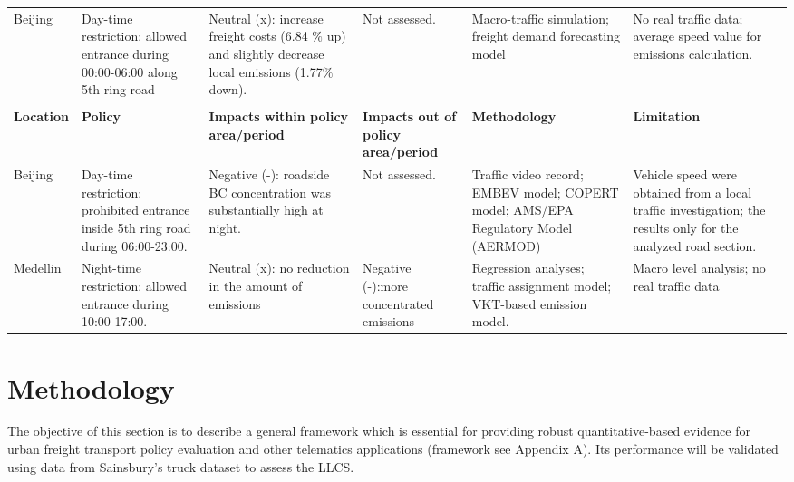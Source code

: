 \documentclass[preprint,12pt,3p]{elsarticle}
\begin{document}
\begin{landscape}
\begin{longtable}{m{2cm}<{\centering} m{3cm} m{4cm} m{4cm} m{3cm} m{6cm}}
   Beijing \cite{RN153} & Day-time restriction: allowed entrance  during 00:00-06:00 along 5th ring road & Neutral (x): increase freight costs  (6.84 $\%$ up) and slightly decrease local emissions (1.77$\%$ down). & Not assessed. & Macro-traffic simulation; freight demand forecasting model
   & No real traffic data; average speed value for emissions calculation. \\
   
   \\
   \hline
   
    \textbf{Location} &\textbf{Policy} &\textbf{Impacts within policy area/period} &\textbf{Impacts out of policy area/period} &\textbf{Methodology} &\textbf{Limitation}\\
    
  \hline
   Beijing \cite{RN80} & Day-time restriction: prohibited entrance inside 5th ring road during 06:00-23:00. & Negative (-): roadside BC concentration was substantially high at night. & Not assessed. & Traffic video record; EMBEV model; COPERT model; AMS/EPA Regulatory Model (AERMOD) & Vehicle speed were obtained from a local traffic investigation; the results only for the analyzed road section. \\
   
   Medellin \cite{RN69} & Night-time restriction: allowed entrance during 10:00-17:00. & Neutral (x): no reduction in the amount of emissions & Negative (-):more concentrated emissions & Regression analyses; traffic assignment model; VKT-based emission model. & Macro level analysis; no real traffic data \\
  
   
  \bottomrule[1.2pt]
  \end{longtable}


\end{landscape}






\section{Methodology}
\label{sec3}

The objective of this section is to describe a general framework which is essential for providing robust quantitative-based evidence for urban freight transport policy evaluation and other telematics applications (framework see Appendix A). Its performance will be validated using data from Sainsbury’s truck dataset to assess the LLCS.
\end{document}
